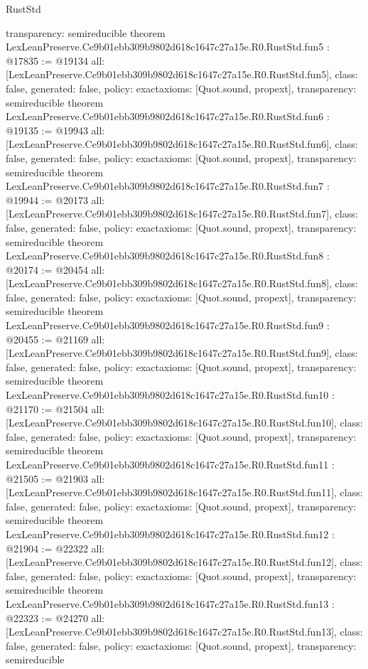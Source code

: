 \begin{lexlean}{RustStd}
\begin{coremodule}
{  transparency: semireducible
}
theorem LexLeanPreserve.Ce9b01ebb309b9802d618c1647c27a15e.R0.RustStd.fun5 : @17835 := @19134 {
  all: [LexLeanPreserve.Ce9b01ebb309b9802d618c1647c27a15e.R0.RustStd.fun5],
  class: false,
  generated: false,
  policy: exact{axioms: [Quot.sound, propext]},
  transparency: semireducible
}
theorem LexLeanPreserve.Ce9b01ebb309b9802d618c1647c27a15e.R0.RustStd.fun6 : @19135 := @19943 {
  all: [LexLeanPreserve.Ce9b01ebb309b9802d618c1647c27a15e.R0.RustStd.fun6],
  class: false,
  generated: false,
  policy: exact{axioms: [Quot.sound, propext]},
  transparency: semireducible
}
theorem LexLeanPreserve.Ce9b01ebb309b9802d618c1647c27a15e.R0.RustStd.fun7 : @19944 := @20173 {
  all: [LexLeanPreserve.Ce9b01ebb309b9802d618c1647c27a15e.R0.RustStd.fun7],
  class: false,
  generated: false,
  policy: exact{axioms: [Quot.sound, propext]},
  transparency: semireducible
}
theorem LexLeanPreserve.Ce9b01ebb309b9802d618c1647c27a15e.R0.RustStd.fun8 : @20174 := @20454 {
  all: [LexLeanPreserve.Ce9b01ebb309b9802d618c1647c27a15e.R0.RustStd.fun8],
  class: false,
  generated: false,
  policy: exact{axioms: [Quot.sound, propext]},
  transparency: semireducible
}
theorem LexLeanPreserve.Ce9b01ebb309b9802d618c1647c27a15e.R0.RustStd.fun9 : @20455 := @21169 {
  all: [LexLeanPreserve.Ce9b01ebb309b9802d618c1647c27a15e.R0.RustStd.fun9],
  class: false,
  generated: false,
  policy: exact{axioms: [Quot.sound, propext]},
  transparency: semireducible
}
theorem LexLeanPreserve.Ce9b01ebb309b9802d618c1647c27a15e.R0.RustStd.fun10 : @21170 := @21504 {
  all: [LexLeanPreserve.Ce9b01ebb309b9802d618c1647c27a15e.R0.RustStd.fun10],
  class: false,
  generated: false,
  policy: exact{axioms: [Quot.sound, propext]},
  transparency: semireducible
}
theorem LexLeanPreserve.Ce9b01ebb309b9802d618c1647c27a15e.R0.RustStd.fun11 : @21505 := @21903 {
  all: [LexLeanPreserve.Ce9b01ebb309b9802d618c1647c27a15e.R0.RustStd.fun11],
  class: false,
  generated: false,
  policy: exact{axioms: [Quot.sound, propext]},
  transparency: semireducible
}
theorem LexLeanPreserve.Ce9b01ebb309b9802d618c1647c27a15e.R0.RustStd.fun12 : @21904 := @22322 {
  all: [LexLeanPreserve.Ce9b01ebb309b9802d618c1647c27a15e.R0.RustStd.fun12],
  class: false,
  generated: false,
  policy: exact{axioms: [Quot.sound, propext]},
  transparency: semireducible
}
theorem LexLeanPreserve.Ce9b01ebb309b9802d618c1647c27a15e.R0.RustStd.fun13 : @22323 := @24270 {
  all: [LexLeanPreserve.Ce9b01ebb309b9802d618c1647c27a15e.R0.RustStd.fun13],
  class: false,
  generated: false,
  policy: exact{axioms: [Quot.sound, propext]},
  transparency: semireducible
}
\end{coremodule}
\end{lexlean}
